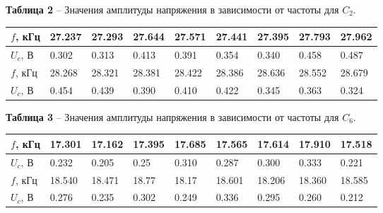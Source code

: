 \documentclass[12pt,a4paper]{article}
\begin{document}
        \begin{table}[!h]
            \begin{center}
           		\textbf{Таблица 2} -- Значения амплитуды напряжения в зависимости от частоты для $C_2$. \\
                \begin{tabular}{ | l | l | l | l | l | l | l | l | l | }
                    \hline
                    $f$, кГц & 27.237 & 27.293 & 27.644 & 27.571 & 27.441 & 27.395 & 27.793 & 27.962    \\
                    \hline
                    $U_c$, В & 0.302  & 0.313  & 0.413  & 0.391  & 0.354  & 0.340  & 0.458 & 0.487      \\
                    \hline
                    $f$, кГц & 28.268 & 28.321 & 28.381 & 28.422 & 28.386 & 28.636 & 28.552 & 28.679    \\
                    \hline
                    $U_c$, В & 0.454  & 0.439  & 0.390  & 0.410  & 0.422  & 0.345  & 0.363  & 0.324     \\
                    \hline                
                \end{tabular}
            \end{center}
        \end{table}
        \begin{table}[!h]
            \begin{center}
           		\textbf{Таблица 3} -- Значения амплитуды напряжения в зависимости от частоты для $C_6$. \\
                \begin{tabular}{ | l | l | l | l | l | l | l | l | l | }
                    \hline
                    $f$, кГц & 17.301 & 17.162 & 17.395 & 17.685 & 17.565 & 17.614 & 17.910 & 17.518    \\
                    \hline
                    $U_c$, В & 0.232  & 0.205  & 0.25   & 0.310  & 0.287  & 0.300  & 0.333 & 0.221     \\
                    \hline
                    $f$, кГц & 18.540 & 18.471 & 18.77  & 18.17  & 18.601 & 18.206 & 18.360 & 18.585    \\
                    \hline
                    $U_c$, В & 0.276  & 0.235  & 0.302  & 0.249  & 0.336  & 0.295  & 0.260  & 0.212     \\
                    \hline                
                \end{tabular}
            \end{center}
        \end{table}
        
\end{document}
